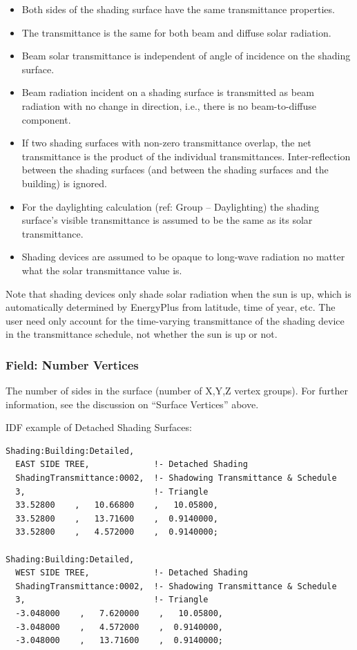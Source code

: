 \begin{itemize}
\item
  Both sides of the shading surface have the same transmittance properties.
\item
  The transmittance is the same for both beam and diffuse solar radiation.
\item
  Beam solar transmittance is independent of angle of incidence on the shading surface.
\item
  Beam radiation incident on a shading surface is transmitted as beam radiation with no change in direction, i.e., there is no beam-to-diffuse component.
\item
  If two shading surfaces with non-zero transmittance overlap, the net transmittance is the product of the individual transmittances. Inter-reflection between the shading surfaces (and between the shading surfaces and the building) is ignored.
\item
  For the daylighting calculation (ref: Group -- Daylighting) the shading surface's visible transmittance is assumed to be the same as its solar transmittance.
\item
  Shading devices are assumed to be opaque to long-wave radiation no matter what the solar transmittance value is.
\end{itemize}

Note that shading devices only shade solar radiation when the sun is up, which is automatically determined by EnergyPlus from latitude, time of year, etc. The user need only account for the time-varying transmittance of the shading device in the transmittance schedule, not whether the sun is up or not.

\subsubsection{Field: Number Vertices}\label{field-number-vertices}

The number of sides in the surface (number of X,Y,Z vertex groups). For further information, see the discussion on ``Surface Vertices'' above.

IDF example of Detached Shading Surfaces:

\begin{lstlisting}
Shading:Building:Detailed,
  EAST SIDE TREE,             !- Detached Shading
  ShadingTransmittance:0002,  !- Shadowing Transmittance & Schedule
  3,                          !- Triangle
  33.52800    ,   10.66800    ,   10.05800,
  33.52800    ,   13.71600    ,  0.9140000,
  33.52800    ,   4.572000    ,  0.9140000;

Shading:Building:Detailed,
  WEST SIDE TREE,             !- Detached Shading
  ShadingTransmittance:0002,  !- Shadowing Transmittance & Schedule
  3,                          !- Triangle
  -3.048000    ,   7.620000    ,   10.05800,
  -3.048000    ,   4.572000    ,  0.9140000,
  -3.048000    ,   13.71600    ,  0.9140000;
\end{lstlisting}

